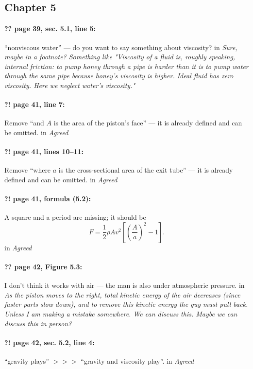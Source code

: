 \documentclass[twoside]{article}
\begin{document}
\subsection*{Chapter 5}

\paragraph{?? page 39, sec. 5.1, line 5:} “nonviscous water” — do you want to say something about viscosity?
 in {\it Sure, maybe in a footnote? Something like "Viscosity of a fluid is, roughly speaking, internal friction: to pump honey through a pipe is harder than it is to pump water through the same pipe because honey's viscosity is higher. Ideal fluid has zero viscosity. Here we neglect water's viscosity."} 

\paragraph{?! page 41, line 7:} Remove “and $A$ is the area of the piston’s face” — it is already defined and can be omitted.
 in {\it  Agreed} 

\paragraph{?! page 41, lines 10--11:} Remove “where $a$ is the cross-sectional area of the exit tube” — it is already defined and can be omitted.
 in {\it  Agreed} 

\paragraph{?! page 41, formula (5.2):} A square and a period are missing; it should be
\[
F = \frac{1}{2} \rho A v^{2} \left[ \left( \frac{A}{a} \right)^{2} - 1 \right].
\]
 in {\it  Agreed} 

\paragraph{?? page 42, Figure 5.3:} I don’t think it works with air — the man is also under atmospheric pressure.
 in {\it As the piston moves to the right, total kinetic energy of the air decreases (since faster parts slow down), and to remove this kinetic energy the guy must pull back. Unless I am making a mistake somewhere. We can discuss this.  Maybe we can discuss this in person?} 


\paragraph{?! page 42, sec. 5.2, line 4:} “gravity plays” $>\!>\!>$ “gravity and viscosity play”.
 in {\it  Agreed} 
\end{document}
